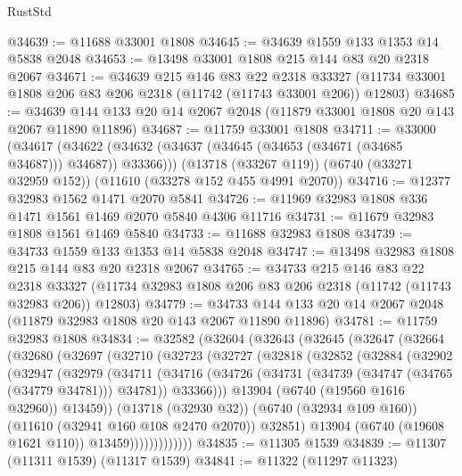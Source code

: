 \begin{lexlean}{RustStd}
\begin{coremodule}
@34639 := @11688 @33001 @1808
@34645 := @34639 @1559 @133 @1353 @14 @5838 @2048
@34653 := @13498 @33001 @1808 @215 @144 @83 @20 @2318 @2067
@34671 := @34639
    @215
    @146
    @83
    @22
    @2318
    @33327
    (@11734 @33001 @1808 @206 @83 @206 @2318 (@11742 (@11743 @33001 @206)) @12803)
@34685 := @34639 @144 @133 @20 @14 @2067 @2048 (@11879 @33001 @1808 @20 @143 @2067 @11890 @11896)
@34687 := @11759 @33001 @1808
@34711 := @33000
    (@34617 (@34622 (@34632 (@34637 (@34645 (@34653 (@34671 (@34685 @34687))) @34687)) @33366)))
    (@13718 (@33267 @119))
    (@6740 (@33271 @32959 @152))
    (@11610 (@33278 @152 @455 @4991 @2070))
@34716 := @12377 @32983 @1562 @1471 @2070 @5841
@34726 := @11969 @32983 @1808 @336 @1471 @1561 @1469 @2070 @5840 @4306 @11716
@34731 := @11679 @32983 @1808 @1561 @1469 @5840
@34733 := @11688 @32983 @1808
@34739 := @34733 @1559 @133 @1353 @14 @5838 @2048
@34747 := @13498 @32983 @1808 @215 @144 @83 @20 @2318 @2067
@34765 := @34733
    @215
    @146
    @83
    @22
    @2318
    @33327
    (@11734 @32983 @1808 @206 @83 @206 @2318 (@11742 (@11743 @32983 @206)) @12803)
@34779 := @34733 @144 @133 @20 @14 @2067 @2048 (@11879 @32983 @1808 @20 @143 @2067 @11890 @11896)
@34781 := @11759 @32983 @1808
@34834 := @32582
    (@32604
      (@32643
        (@32645
          (@32647
            (@32664
              (@32680
                (@32697
                  (@32710
                    (@32723
                      (@32727
                        (@32818
                          (@32852
                            (@32884
                              (@32902
                                (@32947
                                  (@32979
                                    (@34711
                                      (@34716
                                        (@34726
                                          (@34731 (@34739 (@34747 (@34765 (@34779 @34781))) @34781))
                                          @33366)))
                                    @13904
                                    (@6740 (@19560 @1616 @32960))
                                    @13459))
                                (@13718 (@32930 @32))
                                (@6740 (@32934 @109 @160))
                                (@11610 (@32941 @160 @108 @2470 @2070))
                                @32851)
                              @13904
                              (@6740 (@19608 @1621 @110))
                              @13459)))))))))))))
@34835 := @11305 @1539
@34839 := @11307 (@11311 @1539) (@11317 @1539)
@34841 := @11322 (@11297 @11323)

\end{coremodule}
\end{lexlean}
